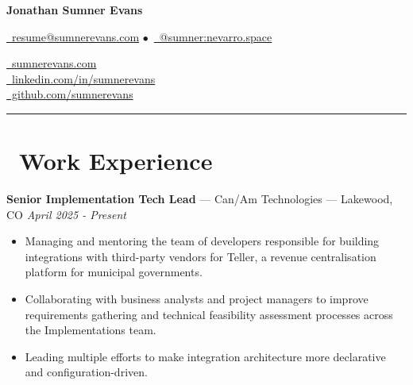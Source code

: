 \documentclass[10pt,letterpaper]{article}
\begin{document}
\begin{minipage}[b][][b]{0.5\linewidth}
    {\huge\textbf{Jonathan Sumner Evans}}

    \vspace{5pt}
    \href{mailto:resume@sumnerevans.com}{\faEnvelope\ resume@sumnerevans.com}
    $\bullet$\ \href{https://matrix.to/#/@sumner:nevarro.space}{\faMatrixOrg\ @sumner:nevarro.space}
\end{minipage}\hfill
\begin{minipage}[b][][b]{0.278\linewidth}
    \href{https://sumnerevans.com}{\faGlobe\ sumnerevans.com} \\
    \href{https://www.linkedin.com/in/sumnerevans}{\faLinkedin\ linkedin.com/in/sumnerevans} \\
    \href{https://github.com/sumnerevans}{\faGithub\ github.com/sumnerevans}
\end{minipage}
\rule{\textwidth}{0.5pt}

\section*{\faBriefcase\ Work Experience}
{\fontsize{11}{0}
\textbf{Senior Implementation Tech Lead} --- Can/Am Technologies --- Lakewood, CO}
\hfill \textit{April 2025 - Present}
\begin{itemize}
    \item Managing and mentoring the team of developers responsible for building
        integrations with third-party vendors for Teller, a revenue
        centralisation platform for municipal governments.
    \item Collaborating with business analysts and project managers to improve
        requirements gathering and technical feasibility assessment processes
        across the Implementations team.
    \item Leading multiple efforts to make integration architecture more
        declarative and configuration-driven.
\end{itemize}
\end{document}
